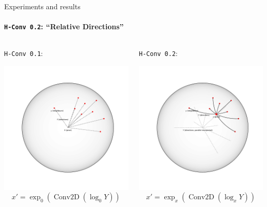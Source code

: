 \documentclass{beamer}
\begin{document}
\begin{frame}{Experiments and results}
    \framesubtitle{\texttt{H-Conv 0.2}: ``Relative Directions''}

    \begin{columns}
        \begin{column}{.45\linewidth}
            \texttt{H-Conv 0.1}:

            \includegraphics[width=.85\linewidth]{art/absolute-locations.pdf}
            \[ x' = \exp_0\left(
                \operatorname{Conv2D}\left(
                    \log_0 Y
                    \right)\right) \]
        \end{column}
        \begin{column}{.45\linewidth}
            \texttt{H-Conv 0.2}:

            \includegraphics[width=.85\linewidth]{art/relative-locations.pdf}
            \[ x' = \exp_x\left(
                \operatorname{Conv2D}\left(
                    \log_x Y\right)\right) \]
        \end{column}
    \end{columns}
\end{frame}
\end{document}
